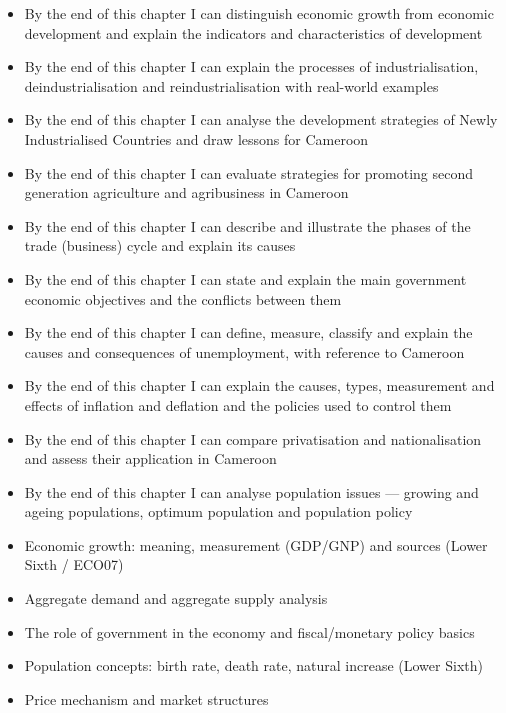 \documentclass[11pt]{article}
\begin{document}
\begin{objectifs}
\begin{itemize}
\item By the end of this chapter I can distinguish economic growth from economic development and explain the indicators and characteristics of development
\item By the end of this chapter I can explain the processes of industrialisation, deindustrialisation and reindustrialisation with real-world examples
\item By the end of this chapter I can analyse the development strategies of Newly Industrialised Countries and draw lessons for Cameroon
\item By the end of this chapter I can evaluate strategies for promoting second generation agriculture and agribusiness in Cameroon
\item By the end of this chapter I can describe and illustrate the phases of the trade (business) cycle and explain its causes
\item By the end of this chapter I can state and explain the main government economic objectives and the conflicts between them
\item By the end of this chapter I can define, measure, classify and explain the causes and consequences of unemployment, with reference to Cameroon
\item By the end of this chapter I can explain the causes, types, measurement and effects of inflation and deflation and the policies used to control them
\item By the end of this chapter I can compare privatisation and nationalisation and assess their application in Cameroon
\item By the end of this chapter I can analyse population issues — growing and ageing populations, optimum population and population policy
\end{itemize}
\end{objectifs}

\begin{prerequis}
\begin{itemize}
\item Economic growth: meaning, measurement (GDP/GNP) and sources (Lower Sixth / ECO07)
\item Aggregate demand and aggregate supply analysis
\item The role of government in the economy and fiscal/monetary policy basics
\item Population concepts: birth rate, death rate, natural increase (Lower Sixth)
\item Price mechanism and market structures
\end{itemize}
\end{prerequis}
\end{document}
